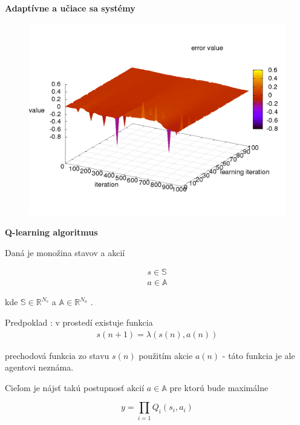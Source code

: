 \documentclass[xcolor=dvipsnames]{beamer}
\begin{document}
\begin{frame}{\bf Adaptívne a učiace sa systémy}
\begin{minipage}{.5\textwidth}
  \begin{figure}[!htb]
  \includegraphics[scale=.15]{../pid_ilc/ilc_result_plant_error.png}
  \end{figure}

\end{minipage}

\end{frame}


\begin{frame}{\bf Q-learning algoritmus}

Daná je monožina stavov a akcií

\begin{align}
        s \in \mathbb{S} \nonumber\\
        a \in \mathbb{A} \nonumber
\end{align}

kde $\mathbb{S} \in \mathbb{R}^{N_s}$ a $\mathbb{A} \in \mathbb{R}^{N_a}$ .

Predpoklad : v prostedí existuje funkcia
\begin{align}
        s(n+1) = \lambda(s(n), a(n))
\end{align}

prechodová funkcia zo stavu $s(n)$ použitím akcie $a(n)$ - táto funkcia je ale agentovi neznáma.

Cieľom je nájsť takú postupnosť akcií $a \in \mathbb{A}$ pre ktorú bude maximálne

\begin{equation} \label{eu_eqn}
y = \prod_{i=1}Q_i(s_i, a_i)
\end{equation}



\end{frame}
\end{document}
